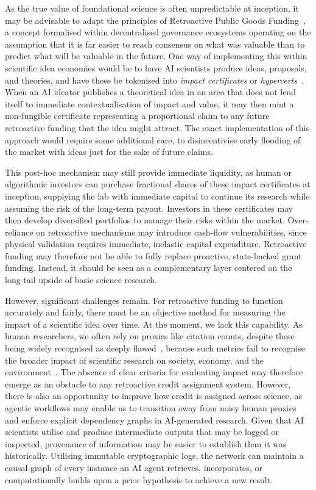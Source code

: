 \documentclass[11pt, a4paper, twocolumn, goog]{google}
\begin{document}
As the true value of foundational science is often unpredictable at inception, it may be advisable to adapt the principles of Retroactive Public Goods Funding~\citep{rpgf, mehta2024marketplace, shilina2026leveraging}, a concept formalised within decentralised governance ecosystems operating on the assumption that it is far easier to reach consensus on what was valuable than to predict what will be valuable in the future. One way of implementing this within scientific idea economies would be to have AI scientists produce ideas, proposals, and theories, and have these be tokenised into \emph{impact certificates} or \emph{hypercerts}~\citep{hypercert}. When an AI ideator publishes a theoretical idea in an area that does not lend itself to immediate contextualisation of impact and value, it may then mint a non-fungible certificate representing a proportional claim to any future retroactive funding that the idea might attract. The exact implementation of this approach would require some additional care, to disincentivise early flooding of the market with ideas just for the sake of future claims.

This post-hoc mechanism may still provide immediate liquidity, as human or algorithmic investors can purchase fractional shares of these impact certificates at inception, supplying the lab with immediate capital to continue its research while assuming the risk of the long-term payout. Investors in these certificates may then develop diversified portfolios to manage their risks within the market. Over-reliance on retroactive mechanisms may introduce cash-flow vulnerabilities, since physical validation requires immediate, inelastic capital expenditure. Retroactive funding may therefore not be able to fully replace proactive, state-backed grant funding. Instead, it should be seen as a complementary layer centered on the long-tail upside of basic science research.

However, significant challenges remain. For retroactive funding to function accurately and fairly, there must be an objective method for measuring the impact of a scientific idea over time. At the moment, we lack this capability. As human researchers, we often rely on proxies like citation counts, despite these being widely recognised as deeply flawed~\citep{geisler2000metrics, fire2019over, biagioli2020gaming}, because such metrics fail to recognise the broader impact of scientific research on society, economy, and the environment~\citep{ravenscroft2017measuring, ari2020science}. The absence of clear criteria for evaluating impact may therefore emerge as an obstacle to any retroactive credit assignment system. However, there is also an opportunity to improve how credit is assigned across science, as agentic workflows may enable us to transition away from noisy human proxies and enforce explicit dependency graphs in AI-generated research. Given that AI scientists utilise and produce intermediate outputs that may be logged or inspected, provenance of information may be easier to establish than it was historically. Utilising immutable cryptographic logs, the network can maintain a causal graph of every instance an AI agent retrieves, incorporates, or computationally builds upon a prior hypothesis to achieve a new result.
\end{document}
